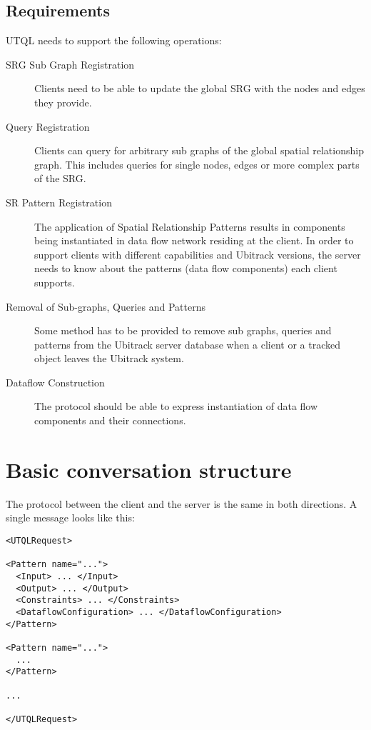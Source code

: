\documentclass[11pt]{article}
\begin{document}
\subsection{Requirements}

UTQL needs to support the following operations:

\begin{description}
\item[SRG Sub Graph Registration] 
Clients need to be able to update the global SRG with the nodes and edges they provide.

\item[Query Registration] 
Clients can query for arbitrary sub graphs of the global spatial relationship graph. This includes queries for single nodes, edges or more complex parts of the SRG.

\item[SR Pattern Registration]
The application of Spatial Relationship Patterns results in
components being instantiated in data flow network residing at the client. In
order to support clients with different capabilities and Ubitrack versions, the
server needs to know about the patterns (data flow components) each client
supports.

\item[Removal of Sub-graphs, Queries and Patterns]
Some method has to be provided to remove sub graphs, queries and
patterns from the Ubitrack server database when a client or a tracked object
leaves the Ubitrack system.

\item[Dataflow Construction]
The protocol should be able to express instantiation of data flow
components and their connections.
\end{description}

\section{Basic conversation structure}

The protocol between the client and the server is the same in both directions. A single message looks like this:

\begin{Verbatim}[fontsize=\footnotesize,tabsize=2]
<UTQLRequest>

<Pattern name="...">
  <Input> ... </Input>
  <Output> ... </Output>
  <Constraints> ... </Constraints>
  <DataflowConfiguration> ... </DataflowConfiguration>
</Pattern>

<Pattern name="...">
  ...
</Pattern>

...

</UTQLRequest>
\end{Verbatim}
\end{document}
